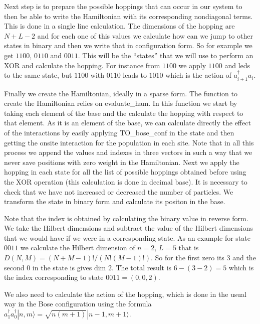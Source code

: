 \documentclass[paper=a4, fontsize=11pt]{scrartcl} %
\numberwithin{equation}{section} %
\numberwithin{figure}{section} %
\numberwithin{table}{section} %
\begin{document}
Next step is to prepare the possible hoppings that can occur in our system to then be able to write the Hamiltonian with its corresponding nondiagonal terms. This is done in a single line calculation. The dimensions of the hopping are $N+L-2$ and for each one of this values we calculate how can we jump to other states in binary and then we write that in configuration form. So for example we get $1100$, $0110$ and $0011$. This will be the ``states'' that we will use to perform an XOR and calculate the hopping. For instance from $1100$ we apply $1100$ and leds to the same state, but $1100$ with $0110$ leads to $1010$ which is the action of $a_{i+1}^{\dagger}a_{i}$.



Finally we create the Hamiltonian, ideally in a sparse form. The function to create the Hamiltonian relies on evaluate\_ham. In this function we start by taking each element of the base and the calculate the hopping with respect to that element. As it is an element of the base, we can calculate directly the effect of the interactions by easily applying TO\_bose\_conf in the state and then getting the onsite interaction for the population in each site. 
Note that in all this process we append the values and indexes in three vectors in such a way that we never save positions with zero weight in the Hamiltonian. Next we apply the hopping in each state for all the list of possible hoppings obtained before using the XOR operation (this calculation is done in decimal base). It is necessary to check that we have not increased or decreased the number of particles. We transform the state in binary form and calculate its positon in the base.

Note that the index is obtained by calculating the binary value in reverse form. We take the Hilbert dimensions and subtract the value of the Hilbert dimensions that we would have if we were in a corresponding state. As an example for state $0011$ we calculate the Hilbert dimension of $n=2,\,L=5$ that is $D(N,M)=(N+M-1)!/(N!(M-1)!)$. So for the first zero its $3$ and the second 0 in the state is gives dim $2$. The total result is $6-(3-2)=5$ which is the index corresponding to state $0011=(0,0,2)$.


We also need to calculate the action of the hopping, which is done in the usual way in the Bose configuration using the formula $a^{\dagger}_{1}a^{\dagger}_{0}|n,m\rangle = \sqrt{n(m+1)}|n-1,m+1\rangle$.
\end{document}
